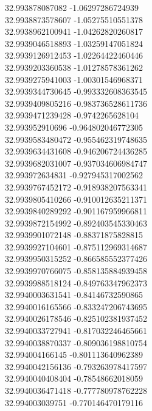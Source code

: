 {32.993878087082	-1.06297286724939\\
32.9938873578607	-1.05275510551378\\
32.9938962100941	-1.04262820260817\\
32.9939046518893	-1.03259147051824\\
32.9939126912453	-1.02264422460446\\
32.9939203360538	-1.01278578361262\\
32.9939275941003	-1.00301546968371\\
32.9939344730645	-0.993332608363545\\
32.9939409805216	-0.983736528611736\\
32.9939471239428	-0.9742265628104\\
32.993952910696	-0.964802046772305\\
32.9939583480472	-0.955462319748635\\
32.9939634431608	-0.946206724436285\\
32.9939682031007	-0.937034606984747\\
32.993972634831	-0.927945317002562\\
32.9939767452172	-0.918938207563341\\
32.9939805410266	-0.910012635211371\\
32.9939840289292	-0.901167959966811\\
32.9939872154992	-0.892403545330463\\
32.9939901072148	-0.88371875828815\\
32.9939927104601	-0.875112969314687\\
32.9939950315252	-0.866585552377426\\
32.9939970766075	-0.858135884939458\\
32.9939988518124	-0.849763347962373\\
32.9940003631541	-0.84146732590865\\
32.9940016165566	-0.833247206743695\\
32.9940026178546	-0.825102381937452\\
32.9940033727941	-0.817032246465661\\
32.9940038870337	-0.809036198810754\\
32.994004166145	-0.801113640962389\\
32.9940042156136	-0.793263978417597\\
32.9940040408404	-0.78548662018059\\
32.9940036471418	-0.777780978762228\\
32.994003039751	-0.770146470179116\\
}
